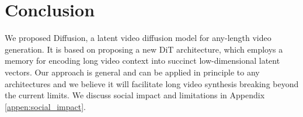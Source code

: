 \section{Conclusion}
\label{sec:conclusion}
We proposed \sname Diffusion, a latent video diffusion model for any-length video generation. It is based on proposing a new DiT architecture, which employs a memory for encoding long video context into succinct low-dimensional latent vectors. Our approach is general and can be applied in principle to any architectures and we believe it will facilitate long video synthesis breaking beyond the current limits.
We discuss social impact and limitations in Appendix \ref{appen:social_impact}.
